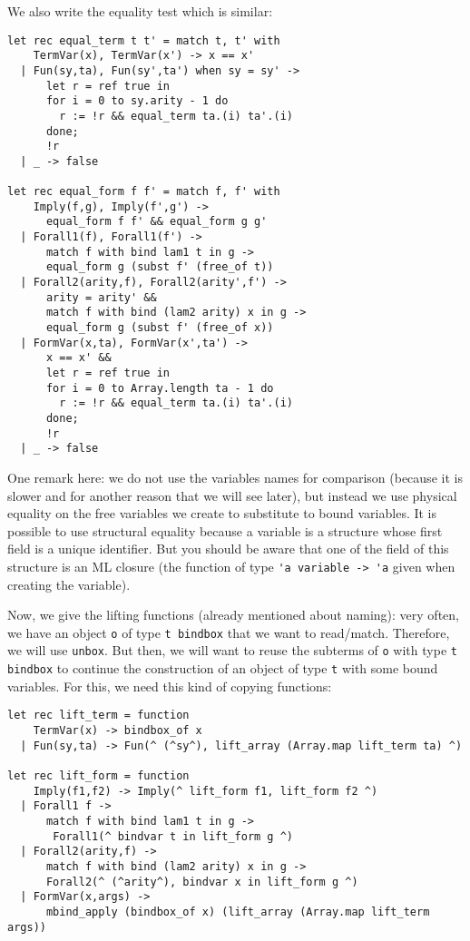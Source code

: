 \documentclass[11pt]{article}
\begin{document}
We also write the equality test which is similar:
\begin{verbatim}
let rec equal_term t t' = match t, t' with
    TermVar(x), TermVar(x') -> x == x'
  | Fun(sy,ta), Fun(sy',ta') when sy = sy' ->
      let r = ref true in
      for i = 0 to sy.arity - 1 do
        r := !r && equal_term ta.(i) ta'.(i)
      done;
      !r
  | _ -> false

let rec equal_form f f' = match f, f' with
    Imply(f,g), Imply(f',g') ->
      equal_form f f' && equal_form g g'
  | Forall1(f), Forall1(f') ->
      match f with bind lam1 t in g ->
      equal_form g (subst f' (free_of t))
  | Forall2(arity,f), Forall2(arity',f') ->
      arity = arity' &&
      match f with bind (lam2 arity) x in g ->
      equal_form g (subst f' (free_of x))
  | FormVar(x,ta), FormVar(x',ta') ->
      x == x' &&
      let r = ref true in
      for i = 0 to Array.length ta - 1 do
        r := !r && equal_term ta.(i) ta'.(i)
      done;
      !r
  | _ -> false
\end{verbatim}

One remark here: we do not use the variables names for comparison
(because it is slower and for another reason that we will see later),
but instead we use physical equality on the free variables we create to substitute to
bound variables.
It is possible to use structural equality because a
variable is a structure whose first field is a unique identifier. But
you should be aware that one of the field of this structure is an ML
closure (the function of type \verb#'a variable -> 'a# given when
creating the variable).

Now, we give the lifting functions (already mentioned about naming): very often, we have
an object \verb#o# of type \verb#t bindbox# that we want to
read/match. Therefore, we will use \verb#unbox#.
But then, we will want to reuse the subterms of \verb#o# with
type  \verb#t bindbox# to continue the construction of an object of
type \verb#t# with some bound variables. For this, we need this kind
of copying functions:

\begin{verbatim}
let rec lift_term = function
    TermVar(x) -> bindbox_of x
  | Fun(sy,ta) -> Fun(^ (^sy^), lift_array (Array.map lift_term ta) ^)

let rec lift_form = function
    Imply(f1,f2) -> Imply(^ lift_form f1, lift_form f2 ^)
  | Forall1 f ->
      match f with bind lam1 t in g ->
       Forall1(^ bindvar t in lift_form g ^)
  | Forall2(arity,f) ->
      match f with bind (lam2 arity) x in g ->
      Forall2(^ (^arity^), bindvar x in lift_form g ^)
  | FormVar(x,args) ->
      mbind_apply (bindbox_of x) (lift_array (Array.map lift_term args))
\end{verbatim}
\end{document}
